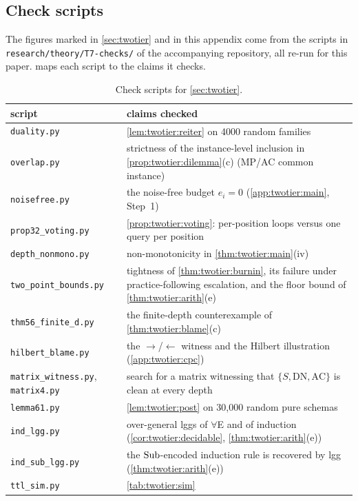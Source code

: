 \subsection{Check scripts}\label{app:twotier:scripts}

The figures marked  in \cref{sec:twotier} and in this appendix come from the scripts in \texttt{research/theory/T7-checks/} of the accompanying repository, all re-run for this paper.  maps each script to the claims it checks.

\begin{table}[ht]
\centering\small
\begin{tabularx}{\textwidth}{@{}lX@{}}
\toprule
script & claims checked\\
\midrule
\texttt{duality.py} & \cref{lem:twotier:reiter} on 4000 random families\\
\texttt{overlap.py} & strictness of the instance-level inclusion in \cref{prop:twotier:dilemma}(c) (MP/AC common instance)\\
\texttt{noisefree.py} & the noise-free budget $e_i=0$ (\cref{app:twotier:main}, Step~1)\\
\texttt{prop32\_voting.py} & \cref{prop:twotier:voting}: per-position loops versus one query per position\\
\texttt{depth\_nonmono.py} & non-monotonicity in \cref{thm:twotier:main}(iv)\\
\texttt{two\_point\_bounds.py} & tightness of \cref{thm:twotier:burnin}, its failure under practice-following escalation, and the floor bound of \cref{thm:twotier:arith}(e)\\
\texttt{thm56\_finite\_d.py} & the finite-depth counterexample of \cref{thm:twotier:blame}(c)\\
\texttt{hilbert\_blame.py} & the $\to$/$\leftarrow$ witness and the Hilbert illustration (\cref{app:twotier:cpc})\\
\texttt{matrix\_witness.py}, \texttt{matrix4.py} & search for a matrix witnessing that $\{S,\mathrm{DN},\mathrm{AC}\}$ is clean at every depth\\
\texttt{lemma61.py} & \cref{lem:twotier:post} on 30{,}000 random pure schemas\\
\texttt{ind\_lgg.py} & over-general lggs of $\forall$E and of induction (\cref{cor:twotier:decidable}, \cref{thm:twotier:arith}(e))\\
\texttt{ind\_sub\_lgg.py} & the $\mathrm{Sub}$-encoded induction rule is recovered by lgg (\cref{thm:twotier:arith}(e))\\
\texttt{ttl\_sim.py} & \cref{tab:twotier:sim}\\
\bottomrule
\end{tabularx}
\caption{Check scripts for \cref{sec:twotier}.}
\label{tab:twotier:scripts}
\end{table}

